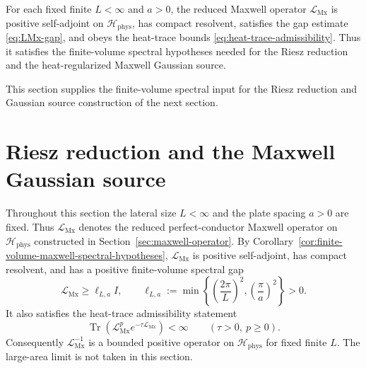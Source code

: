 \documentclass[11pt]{article}
\providecommand{\Tr}{\operatorname{Tr}}
\providecommand{\set}[1]{\left\{#1\right\}}
\providecommand{\paren}[1]{\left(#1\right)}
\providecommand{\Hphys}{\mathcal H_{\mathrm{phys}}}
\providecommand{\LMx}{\mathcal L_{\mathrm{Mx}}}
\numberwithin{equation}{section}
\begin{document}
\begin{corollary}
\label{cor:finite-volume-maxwell-spectral-hypotheses}
For each fixed finite \(L<\infty\) and \(a>0\), the reduced Maxwell operator \(\LMx\) is positive self-adjoint on \(\Hphys\), has compact resolvent, satisfies the gap estimate \eqref{eq:LMx-gap}, and obeys the heat-trace bounds \eqref{eq:heat-trace-admissibility}.  Thus it satisfies the finite-volume spectral hypotheses needed for the Riesz reduction and the heat-regularized Maxwell Gaussian source.
\end{corollary}

\begin{remark}
\label{rem:remaining-after-heat-trace}
This section supplies the finite-volume spectral input for the Riesz reduction
and Gaussian source construction of the next section.
\end{remark}
\section{Riesz reduction and the Maxwell Gaussian source}
\label{sec:riesz-gaussian-source}

Throughout this section the lateral size \(L<\infty\) and the plate spacing
\(a>0\) are fixed.  Thus \(\LMx\) denotes the reduced perfect-conductor Maxwell
operator on \(\Hphys\) constructed in Section~\ref{sec:maxwell-operator}.  By
Corollary~\ref{cor:finite-volume-maxwell-spectral-hypotheses}, \(\LMx\) is
positive self-adjoint, has compact resolvent, and has a positive finite-volume
spectral gap
\begin{equation}
    \LMx\geq \ell_{L,a}I,
    \qquad
    \ell_{L,a}
    :=
    \min\set{\paren{\frac{2\pi}{L}}^2,
              \paren{\frac{\pi}{a}}^2}>0 .
    \label{eq:section04-gap-assumption}
\end{equation}
It also satisfies the heat-trace admissibility statement
\begin{equation}
    \Tr\paren{\LMx^p e^{-\tau\LMx}}<\infty
    \qquad
    (\tau>0,\ p\geq0).
    \label{eq:section04-heat-trace-assumption}
\end{equation}
Consequently \(\LMx^{-1}\) is a bounded positive operator on \(\Hphys\) for
fixed finite \(L\).  The large-area limit is not taken in this section.
\end{document}

